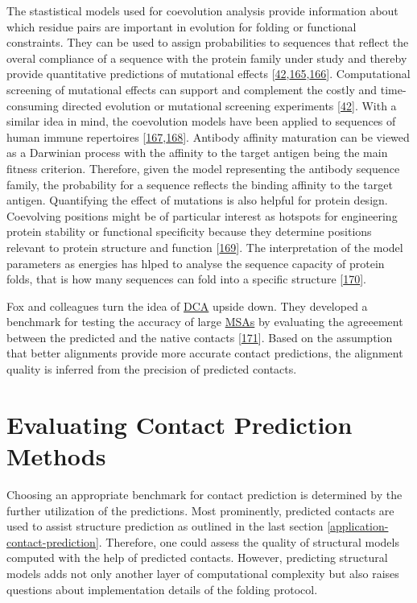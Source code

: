 \documentclass[11pt,a4paper,twoside]{book}
\theoremstyle{definition}
\theoremstyle{definition}
\theoremstyle{remark}
\begin{document}
The stastistical models used for coevolution analysis provide
information about which residue pairs are important in evolution for
folding or functional constraints. They can be used to assign
probabilities to sequences that reflect the overal compliance of a
sequence with the protein family under study and thereby provide
quantitative predictions of mutational effects
{[}\protect\hyperlink{ref-Hopf2017}{42},\protect\hyperlink{ref-Wu2016}{165},\protect\hyperlink{ref-Figliuzzi2015}{166}{]}.
Computational screening of mutational effects can support and complement
the costly and time-consuming directed evolution or mutational screening
experiments {[}\protect\hyperlink{ref-Hopf2017}{42}{]}. With a similar
idea in mind, the coevolution models have been applied to sequences of
human immune repertoires
{[}\protect\hyperlink{ref-Asti2016}{167},\protect\hyperlink{ref-Elhanati2014}{168}{]}.
Antibody affinity maturation can be viewed as a Darwinian process with
the affinity to the target antigen being the main fitness criterion.
Therefore, given the model representing the antibody sequence family,
the probability for a sequence reflects the binding affinity to the
target antigen. Quantifying the effect of mutations is also helpful for
protein design. Coevolving positions might be of particular interest as
hotspots for engineering protein stability or functional specificity
because they determine positions relevant to protein structure and
function {[}\protect\hyperlink{ref-Franceus2016}{169}{]}. The
interpretation of the model parameters as energies has hlped to analyse
the sequence capacity of protein folds, that is how many sequences can
fold into a specific structure
{[}\protect\hyperlink{ref-Tian2017}{170}{]}.

Fox and colleagues turn the idea of \protect\hyperlink{abbrev}{DCA}
upside down. They developed a benchmark for testing the accuracy of
large \protect\hyperlink{abbrev}{MSAs} by evaluating the agreeement
between the predicted and the native contacts
{[}\protect\hyperlink{ref-Fox2016}{171}{]}. Based on the assumption that
better alignments provide more accurate contact predictions, the
alignment quality is inferred from the precision of predicted contacts.

\section{Evaluating Contact Prediction
Methods}\label{intro-cp-evaluation}

Choosing an appropriate benchmark for contact prediction is determined
by the further utilization of the predictions. Most prominently,
predicted contacts are used to assist structure prediction as outlined
in the last section \ref{application-contact-prediction}. Therefore, one
could assess the quality of structural models computed with the help of
predicted contacts. However, predicting structural models adds not only
another layer of computational complexity but also raises questions
about implementation details of the folding protocol.
\end{document}
